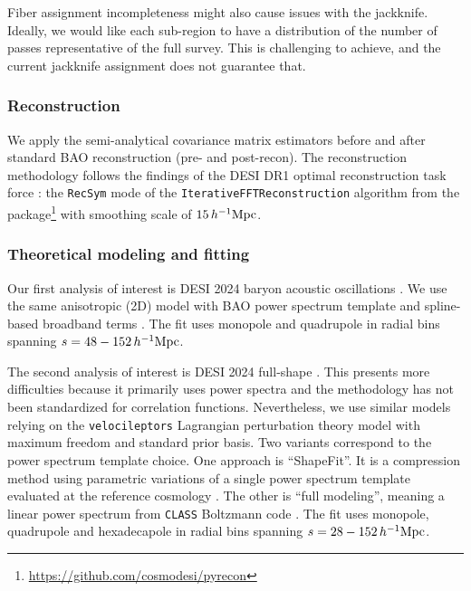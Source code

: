 Fiber assignment incompleteness might also cause issues with the jackknife.
Ideally, we would like each sub-region to have a distribution of the number of passes representative of the full survey.
This is challenging to achieve, and the current jackknife assignment does not guarantee that.

\subsubsection{Reconstruction}
\label{sec:recon}

We apply the semi-analytical covariance matrix estimators before and after standard BAO reconstruction (pre- and post-recon).
The reconstruction methodology follows the findings of the DESI DR1 optimal reconstruction task force \citep{KP4s3-Chen,KP4s4-Paillas}:
the {\tt RecSym} mode of the {\tt IterativeFFTReconstruction} 
algorithm \citep{recon-fourier-space} from the \pyrecon{} package\footnote{\url{https://github.com/cosmodesi/pyrecon}} with smoothing scale of $15\,h^{-1}{\rm Mpc}$.

\subsubsection{Theoretical modeling and fitting}
\label{sec:theoretical-models-fits}

Our first analysis of interest is DESI 2024 baryon acoustic oscillations \citep{DESI2024.III.KP4}.
We use the same anisotropic (2D) model with BAO power spectrum template and spline-based broadband terms \citep{KP4s2-Chen}.
The fit uses monopole and quadrupole in radial bins spanning $s=48-152\,h^{-1}{\rm Mpc}$.

The second analysis of interest is DESI 2024 full-shape \citep{DESI2024.V.KP5}.
This presents more difficulties because it primarily uses power spectra and the methodology has not been standardized for correlation functions.
Nevertheless, we use similar models relying on the {\tt velocileptors} Lagrangian perturbation theory model \citep{velocileptors-Chen2020,velocileptors-Chen2021,KP5s2-Maus} with maximum freedom and standard prior basis.
Two variants correspond to the power spectrum template choice.
One approach is ``ShapeFit''.
It is a compression method using parametric variations of a single power spectrum template evaluated at the reference cosmology \citep{ShapeFit-Brieden21}.
The other is ``full modeling'', meaning a linear power spectrum from \texttt{CLASS} Boltzmann code \citep{CLASS}.
The fit uses monopole, quadrupole and hexadecapole in radial bins spanning $s=28-152\,h^{-1}{\rm Mpc}$.

